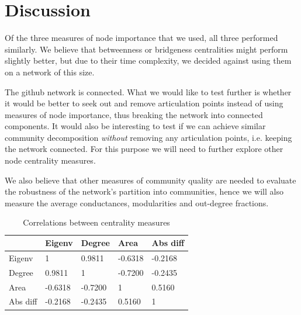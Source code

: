 \documentclass[9pt,twocolumn,twoside]{pnas-new}
\begin{document}
\pagebreak
\section*{Discussion}
Of the three measures of node importance that we used, all three performed similarly. 
We believe that betweenness or bridgeness centralities might perform slightly better, but due to their time complexity, we decided against using them on a network of this size.

The github network is connected. 
What we would like to test further is whether it would be better to seek out and remove articulation points instead of using measures of node importance, thus breaking the network into connected components.
It would also be interesting to test if we can achieve similar community decomposition \emph{without} removing any articulation points,
i.e. keeping the network connected. For this purpose we will need to further explore other node centrality measures.

We also believe that other measures of community quality are needed to evaluate the robustness of the network's partition into communities, hence we will also measure the average conductances, modularities and out-degree fractions.

\begin{table}
    \centering
    \begin{tabular}{|l|l|l|l|l|}
        \hline
        & Eigenv & Degree & Area & Abs diff \\ \hline
        Eigenv & 1 & 0.9811 & -0.6318 & -0.2168 \\ \hline
        Degree & 0.9811 & 1 & -0.7200 & -0.2435 \\ \hline
        Area & -0.6318 & -0.7200 & 1 & 0.5160 \\ \hline
        Abs diff & -0.2168 & -0.2435 & 0.5160 & 1 \\ \hline
    \end{tabular}
    \caption{Correlations between centrality measures}
    \label{tab:cor}
\end{table}



\end{document}
